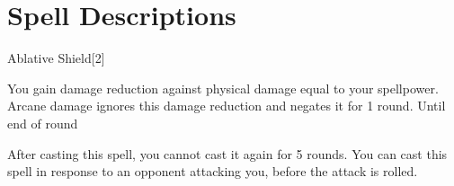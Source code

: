 \section{Spell Descriptions}

\small


\begin{spellsection}{Ablative Shield}[2]
    \begin{spellheader}
    \end{spellheader}
    \begin{spellcontent}
        \begin{spelltargetinginfo}
        \end{spelltargetinginfo}
        \begin{spelleffects}
            \spelleffect You gain damage reduction against physical damage equal to your spellpower.
            Arcane damage ignores this damage reduction and negates it for 1 round.
            \spelldur Until end of round
        \end{spelleffects}
    \end{spellcontent}
    \begin{spellfooter}
        \spellnotes After casting this spell, you cannot cast it again for 5 rounds.
        You can cast this spell in response to an opponent attacking you, before the attack is rolled.
        \miscastexplode
    \end{spellfooter}
    \begin{spellaugments}
    \end{spellaugments}
\end{spellsection}

